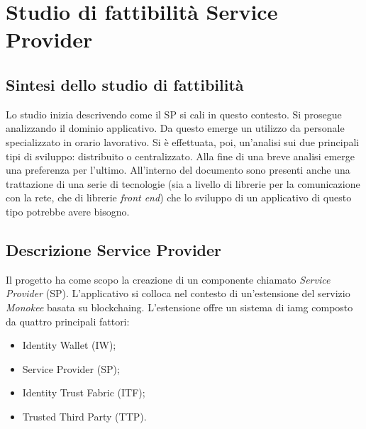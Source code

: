 \section{Studio di fattibilità Service Provider}
\subsection{Sintesi dello studio di fattibilità}
Lo studio inizia descrivendo come il SP si cali in questo contesto. Si prosegue analizzando il dominio applicativo. Da questo emerge un utilizzo da personale specializzato in orario lavorativo. Si è effettuata, poi, un’analisi sui due principali tipi di sviluppo: distribuito o centralizzato. Alla fine di una breve analisi emerge una preferenza per l’ultimo. All’interno del documento sono presenti anche una trattazione di una serie di tecnologie (sia a livello di librerie per la comunicazione con la rete, che di librerie \emph{front end}) che lo sviluppo di un applicativo di questo tipo potrebbe avere bisogno. 
\subsection{Descrizione Service Provider}
Il progetto ha come scopo la creazione di un componente chiamato \emph{Service Provider} (SP). L’applicativo si colloca nel contesto di un’estensione del servizio \emph{Monokee} basata su \gls{blockchaing}. L’estensione offre un sistema di \gls{iamg} composto da quattro principali fattori: 
\begin{itemize}
    \item Identity Wallet (IW);
    \item Service Provider (SP); 
    \item Identity Trust Fabric (ITF); 
    \item Trusted Third Party (TTP).
\end{itemize}
    
